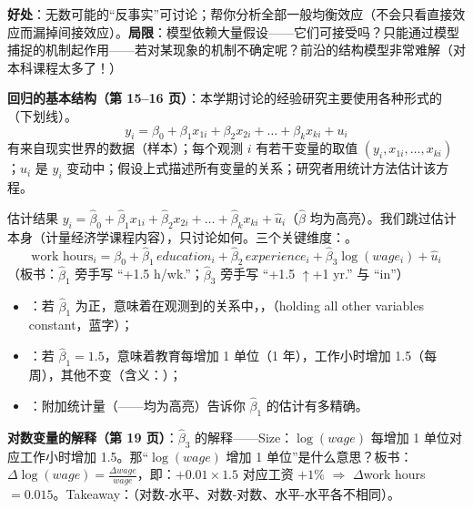 \begin{intubox}[结构式分析的得与失（第 14 页）]
\textbf{好处}：无数可能的``反事实''可讨论；帮你分析全部一般均衡效应（不会只看直接效应而漏掉间接效应）。\textbf{局限}：模型依赖大量假设——它们可接受吗？只能通过模型捕捉的机制起作用——若对某现象的机制不确定呢？前沿的结构模型非常难解（对本科课程太多了！）
\end{intubox}


\textbf{回归的基本结构（第 15--16 页）}：本学期讨论的经验研究主要使用各种形式的（下划线）。
\[
y_i = \beta_0 + \beta_1 x_{1i} + \beta_2 x_{2i} + \dots + \beta_k x_{ki} + u_i
\]
有来自现实世界的数据（样本）；每个观测 $i$ 有若干变量的取值 $(y_i, x_{1i}, \dots, x_{ki})$；$u_i$ 是 $y_i$ 变动中；假设上式描述所有变量的关系；研究者用统计方法估计该方程。

\begin{thmbox}
估计结果 $y_i = \hat\beta_0 + \hat\beta_1 x_{1i} + \hat\beta_2 x_{2i} + \dots + \hat\beta_k x_{ki} + \hat u_i$（$\hat\beta$ 均为高亮）。我们跳过估计本身（计量经济学课程内容），只讨论如何。三个关键维度：。
\[
\text{work hours}_i = \beta_0 + \hat\beta_1\, education_i + \hat\beta_2\, experience_i + \hat\beta_3 \log(wage_i) + \hat u_i
\]
（板书：$\hat\beta_1$ 旁手写 ``+1.5 h/wk.''；$\hat\beta_3$ 旁手写 ``+1.5 $\uparrow$+1 yr.'' 与 ``in''）
\begin{itemize}
  \item {}：若 $\hat\beta_1$ 为正，意味着在观测到的关系中，，（holding all other variables constant，蓝字）；
  \item {}：若 $\hat\beta_1 = 1.5$，意味着教育每增加 1 单位（1 年），工作小时增加 1.5（每周），其他不变（含义：）；
  \item {}：附加统计量（——均为高亮）告诉你 $\hat\beta_1$ 的估计有多精确。
\end{itemize}
\end{thmbox}

\textbf{对数变量的解释（第 19 页）}：$\hat\beta_3$ 的解释——Size：$\log(wage)$ 每增加 1 单位对应工作小时增加 1.5。那``$\log(wage)$ 增加 1 单位''是什么意思？板书：$\Delta \log(wage) = \frac{\Delta wage}{wage}$，即：$+0.01 \times 1.5$ 对应工资 $+1\%$ $\Rightarrow$ $\Delta$work hours $= 0.015$。Takeaway：（对数-水平、对数-对数、水平-水平各不相同）。

